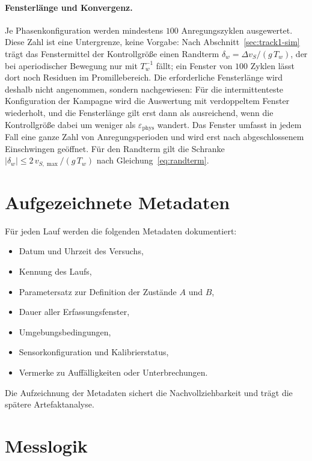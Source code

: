 \documentclass[12pt,a4paper]{report}
\begin{document}
\paragraph{Fensterlänge und Konvergenz.}
Je Phasenkonfiguration werden mindestens $100$ Anregungszyklen
ausgewertet. Diese Zahl ist eine Untergrenze, keine Vorgabe: Nach
Abschnitt~\ref{sec:track1-sim} trägt das Fenstermittel der Kontrollgröße
einen Randterm $\delta_w = \Delta v_S/(g\,T_w)$, der bei aperiodischer
Bewegung nur mit $T_w^{-1}$ fällt; ein Fenster von $100$ Zyklen lässt dort
noch Residuen im Promillebereich. Die
erforderliche Fensterlänge wird deshalb nicht angenommen, sondern
nachgewiesen: Für die intermittenteste Konfiguration der Kampagne wird
die Auswertung mit verdoppeltem Fenster wiederholt, und die Fensterlänge
gilt erst dann als ausreichend, wenn die Kontrollgröße dabei um weniger
als $\varepsilon_{\mathrm{phys}}$ wandert. Das Fenster umfasst in jedem Fall eine ganze Zahl von Anregungsperioden
und wird erst nach abgeschlossenem Einschwingen geöffnet. Für den
Randterm gilt die Schranke $|\delta_w| \le 2\,v_{S,\max}/(g\,T_w)$ nach
Gleichung~\eqref{eq:randterm}.

\section{Aufgezeichnete Metadaten}

Für jeden Lauf werden die folgenden Metadaten dokumentiert:

\begin{itemize}
\item Datum und Uhrzeit des Versuchs,
\item Kennung des Laufs,
\item Parametersatz zur Definition der Zustände $A$ und $B$,
\item Dauer aller Erfassungsfenster,
\item Umgebungsbedingungen,
\item Sensorkonfiguration und Kalibrierstatus,
\item Vermerke zu Auffälligkeiten oder Unterbrechungen.
\end{itemize}

Die Aufzeichnung der Metadaten sichert die Nachvollziehbarkeit und trägt
die spätere Artefaktanalyse.

\section{Messlogik}
\end{document}
